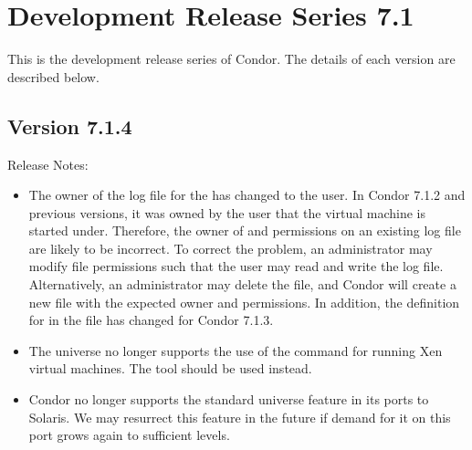 
\section{\label{sec:History-7-1}Development Release Series 7.1}

This is the development release series of Condor.
The details of each version are described below.


\subsection*{\label{sec:New-7-1-4}Version 7.1.4}

\noindent Release Notes:

\begin{itemize}

\item The owner of the log file for the 
has changed to the  user.
In Condor 7.1.2 and previous versions, it was owned by the
user that the virtual machine is started under.
Therefore, the owner of and permissions on an existing log file
are likely to be incorrect.
To correct the problem, an administrator may modify file
permissions such that the  user may read and
write the log file.
Alternatively, an administrator may delete the file, and
Condor will create a new file with the expected owner and
permissions.
In addition, the definition for 
in the  file has changed for
Condor 7.1.3.

\item The  universe no longer supports the use of 
the 
command for running Xen virtual machines. The  tool
should be used instead.

\item Condor no longer supports the standard universe feature in its
ports to Solaris. We may resurrect this feature in the future if demand
for it on this port grows again to sufficient levels.

\end{itemize}


